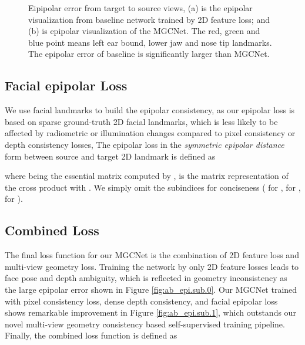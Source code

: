\documentclass[runningheads]{llncs}
\begin{document}
\begin{figure}[htbp]
	\centering  
	\caption{Eipipolar error from target to source views, (a) is the epipolar visualization from baseline network trained by 2D feature loss; and (b) is epipolar visualization of the MGCNet. The red, green and blue point means left ear bound, lower jaw and nose tip landmarks. The epipolar error of baseline is significantly larger than MGCNet.
	}
	\label{fig:ab_epi}
\end{figure}

\subsection{Facial epipolar Loss} \label{sec:epi}
We use facial landmarks to build the epipolar consistency, as our epipolar loss is based on sparse ground-truth 2D facial landmarks, which is less likely to be affected by radiometric or illumination changes compared to pixel consistency or depth consistency losses, 
The epipolar loss in the \textit{symmetric epipolar distance}~\cite{hartley2003multiple} form between source and target 2D landmark  is defined as

where  being the essential matrix computed by ,  is the matrix representation of the cross product with . We simply omit the subindices for conciseness ( for ,  for ,  for ).




\subsection{Combined Loss}
The final loss function  for our MGCNet is the combination of 2D feature loss and multi-view geometry loss.
Training the network by only 2D feature losses leads to face pose and depth ambiguity, which is reflected in geometry inconsistency as the large epipolar error shown in Figure \ref{fig:ab_epi.sub.0}.
Our MGCNet trained with pixel consistency loss, dense depth consistency, and facial epipolar loss shows remarkable improvement in Figure \ref{fig:ab_epi.sub.1}, which outstands our novel multi-view geometry consistency based self-supervised training pipeline.
Finally, the combined loss function is defined as
\end{document}
